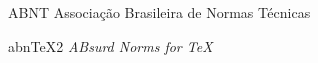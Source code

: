 \begin{siglas}
    \item[ABNT] Associação Brasileira de Normas Técnicas
    \item[abnTeX2] \textit{ABsurd Norms for TeX}
\end{siglas}